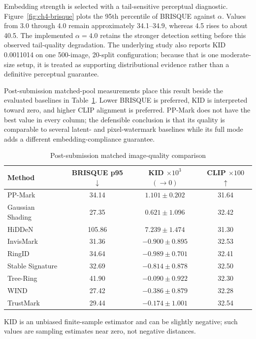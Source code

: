 Embedding strength is selected with a tail-sensitive perceptual diagnostic.
Figure~\ref{fig:ch4-brisque} plots the 95th percentile of BRISQUE against
\(\alpha\).  Values from 3.0 through 4.0 remain approximately 34.1--34.9, whereas
4.5 rises to about 40.5.  The implemented \(\alpha=4.0\) retains the stronger
detection setting before this observed tail-quality degradation.  The underlying
study also reports KID 0.0011014 on one 500-image, 20-split configuration; because
that is one moderate-size setup, it is treated as supporting distributional
evidence rather than a definitive perceptual guarantee.

Post-submission matched-pool measurements place this result beside the evaluated
baselines in Table~\ref{tab:ch4-matched-quality}.  Lower BRISQUE is preferred,
KID is interpreted toward zero, and higher CLIP alignment is preferred.  PP-Mark
does not have the best value in every column; the defensible conclusion is that its
quality is comparable to several latent- and pixel-watermark baselines while its
full mode adds a different embedding-compliance guarantee.

\begin{table}[tbp]
    \centering
    \caption{Post-submission matched image-quality comparison}
    \label{tab:ch4-matched-quality}
    \footnotesize
    \setlength{\tabcolsep}{6pt}
    \renewcommand{\arraystretch}{1.10}
    \begin{tabular}{@{}lccc@{}}
        \toprule
        Method & BRISQUE p95 \(\downarrow\) &
        KID \(\times10^3\) \((\rightarrow0)\) & CLIP \(\times100\) \(\uparrow\) \\
        \midrule
        PP-Mark          & 34.14  & $1.101\pm0.202$   & 31.64 \\
        Gaussian Shading & 27.35  & $0.621\pm1.096$   & 32.42 \\
        HiDDeN           & 105.86 & $7.239\pm1.474$   & 31.30 \\
        InvisMark        & 31.36  & $-0.900\pm0.895$  & 32.53 \\
        RingID           & 34.64  & $-0.989\pm0.701$  & 32.41 \\
        Stable Signature & 32.69  & $-0.814\pm0.878$  & 32.50 \\
        Tree-Ring        & 41.90  & $-0.090\pm0.922$  & 32.30 \\
        WIND             & 27.42  & $-0.386\pm0.879$  & 32.28 \\
        TrustMark        & 29.44  & $-0.174\pm1.001$  & 32.54 \\
        \bottomrule
    \end{tabular}

    \vspace{2pt}
    \parbox{0.94\textwidth}{\footnotesize
    KID is an unbiased finite-sample estimator and can be slightly negative; such
    values are sampling estimates near zero, not negative distances.}
\end{table}

